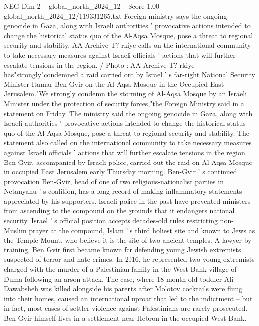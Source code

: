 \begin{textsample}{NEG Dim 2 – global\_north\_2024\_12 – Score 1.00 – global\_north\_2024\_12/119331265.txt}  \label{ex:f2_neg_264}
Foreign ministry says the ongoing genocide in Gaza, along with Israeli authorities ' provocative actions intended to change the historical status quo of the Al-Aqsa Mosque, pose a threat to regional security and stability.
AA Archive T? rkiye calls on the international community to take necessary measures against Israeli officials ' actions that will further escalate tensions in the region. / Photo : AA Archive T? rkiye has"strongly"condemned a raid carried out by Israel ' s far-right National Security Minister Itamar Ben-Gvir on the Al-Aqsa Mosque in the Occupied East Jerusalem."We strongly condemn the storming of Al-Aqsa Mosque by an Israeli Minister under the protection of security forces,"the Foreign Ministry said in a statement on Friday.
The ministry said the ongoing genocide in Gaza, along with Israeli authorities ' provocative actions intended to change the historical status quo of the Al-Aqsa Mosque, pose a threat to regional security and stability.
The statement also called on the international community to take necessary measures against Israeli officials ' actions that will further escalate tensions in the region.
Ben-Gvir, accompanied by Israeli police, carried out the raid on Al-Aqsa Mosque in occupied East Jerusalem early Thursday morning.
Ben-Gvir ' s continued provocation Ben-Gvir, head of one of two religious-nationalist parties in Netanyahu ' s coalition, has a long record of making inflammatory statements appreciated by his supporters.
Israeli police in the past have prevented ministers from ascending to the compound on the grounds that it endangers national security.
Israel ' s official position accepts decades-old rules restricting non-Muslim prayer at the compound, Islam ' s third holiest site and known to Jews as the Temple Mount, who believe it is the site of two ancient temples.
A lawyer by training, Ben Gvir first became known for defending young Jewish extremists suspected of terror and hate crimes.
In 2016, he represented two young extremists charged with the murder of a Palestinian family in the West Bank village of Duma following an arson attack.
The case, where 18-month-old toddler Ali Dawabsheh was killed alongside his parents after Molotov cocktails were flung into their homes, caused an international uproar that led to the indictment -- but in fact, most cases of settler violence against Palestinians are rarely prosecuted.
Ben Gvir himself lives in a settlement near Hebron in the occupied West Bank.

\end{textsample}
